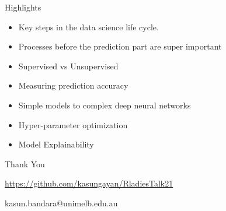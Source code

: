 \documentclass[12pt,ignorenonframetext,]{beamer}
\providecommand{\tightlist}{%
  \setlength{\itemsep}{0pt}\setlength{\parskip}{0pt}}
\begin{document}
\begin{frame}{Highlights}
\protect\hypertarget{highlights}{}

\begin{itemize}
\tightlist
\item
  Key steps in the data science life cycle. \vspace{2mm}
\item
  Processes before the prediction part are super important \vspace{2mm}
\item
  Supervised vs Unsupervised \vspace{2mm}
\item
  Measuring prediction accuracy \vspace{2mm}
\item
  Simple models to complex deep neural networks \vspace{2mm}
\item
  Hyper-parameter optimization \vspace{2mm}
\item
  Model Explainability
\end{itemize}

\end{frame}

\begin{frame}{}
\protect\hypertarget{section}{}

\Huge
\center

Thank You

\normalsize

\url{https://github.com/kasungayan/RladiesTalk21}

kasun.bandara@unimelb.edu.au

\end{frame}
\end{document}
